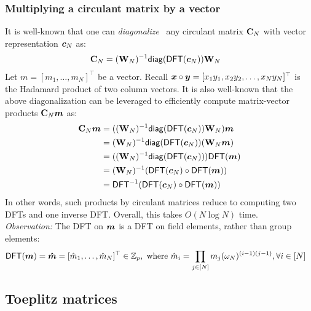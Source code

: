 \subsubsection{Multiplying a circulant matrix by a vector}
\label{s:circulant:diag-dft}
\label{s:circulant:multiply-vec}
It is well-known that one can \textit{diagonalize}~\cite{Diag20} any circulant matrix $\mathbf{C}_N$ with vector representation $\bm{c}_N$ as:
\begin{align}
    \mathbf{C}_N
     &= (\mathbf{W}_N)^{-1} \mathsf{diag}(\mathsf{DFT}(\bm{c}_N)) \mathbf{W}_N
\end{align}
Let $m=[m_1,\dots,m_N]^\top$ be a vector.
Recall $\bm{x}\circ\bm{y} = [x_1 y_1, x_2 y_2,\dots, x_N y_N]^\top$ is the Hadamard product of two column vectors.
It is also well-known that the above diagonalization can be leveraged to efficiently compute matrix-vector products $\mathbf{C}_N\bm{m}$ as:
\begin{align}
    \mathbf{C}_N \bm{m}
        &= ((\mathbf{W}_N)^{-1} \mathsf{diag}(\mathsf{DFT}(\bm{c}_N)) \mathbf{W}_N)\bm{m}\\
        &= (\mathbf{W}_N)^{-1} \mathsf{diag}(\mathsf{DFT}(\bm{c}_N)) (\mathbf{W}_N\bm{m})\\
        &= ((\mathbf{W}_N)^{-1} \mathsf{diag}(\mathsf{DFT}(\bm{c}_N))) \mathsf{DFT}(\bm{m})\\
        &= (\mathbf{W}_N)^{-1} (\mathsf{DFT}(\bm{c}_N)\circ \mathsf{DFT}(\bm{m}))\\
        &= \mathsf{DFT}^{-1}(\mathsf{DFT}(\bm{c}_N)\circ \mathsf{DFT}(\bm{m}))
\end{align}
In other words, such products by circulant matrices reduce to computing two DFTs and one inverse DFT.
Overall, this takes $O(N\log{N})$ time.
\\

\noindent\textit{Observation:} The DFT on $\bm{m}$ is a DFT on field elements, rather than group elements:
\begin{align}
    \mathsf{DFT}(\bm{m}) &= \bm{\hat{m}} = [\hat{m}_1, \dots, \hat{m}_N]^\top\in \mathbb{Z}_p,\ \text{where}\ \hat{m}_i= \prod_{j\in [N]} m_j (\omega_N)^{(i-1)(j-1)},\forall i\in[N]
\end{align}

\subsection{Toeplitz matrices}
\label{s:toeplitz}


